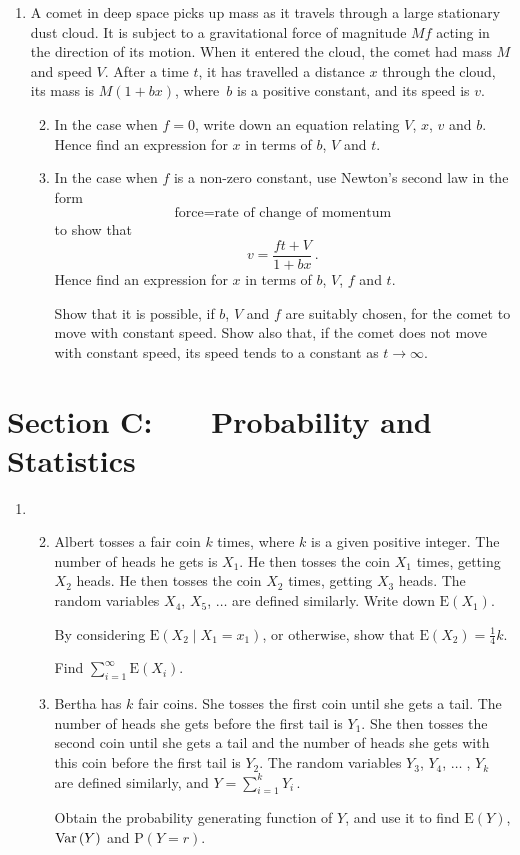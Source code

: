 \documentclass[a4, 11pt]{report}
\newlength{\qspace}
\newcounter{qnumber}
\newenvironment{question}%
 {\vspace{\qspace}
  \begin{enumerate}[\bfseries 1\quad][10]%
    \setcounter{enumi}{\value{qnumber}}%
    \item%
 }
{
  \end{enumerate}
  \filbreak
  \stepcounter{qnumber}
 }
\newenvironment{questionparts}[1][1]%
 {
  \begin{enumerate}[\bfseries (i)]%
    \setcounter{enumii}{#1}
    \addtocounter{enumii}{-1}
    \setlength{\itemsep}{5mm}
    \setlength{\parskip}{8pt}
 }
 {
  \end{enumerate}
 }
\def\E{{\mathrm E}}
\def\P{{\mathrm P}}
\def\var{{\rm Var}\,}
\begin{document}
\begin{question}
A comet in deep space picks up mass as it travels through a
large stationary dust cloud. 
It is subject to a gravitational force of magnitude
$M\!f$ acting in the direction of its motion.
When  it entered the 
cloud, the comet had mass  $M$ and  speed  $V$. 
After  a time $t$,
it has travelled a distance $x$ through the cloud, 
its mass is $M(1+bx)$, where~$b$ is a positive constant, and  its speed
is $v$. 

\begin{questionparts}
\item In the case when $f=0$, 
write down an  equation relating 
$V$, $x$, $v$ and $b$.
Hence find an expression for $x$ in  terms of $b$, $V$ and $t$.

\item  In the case when $f$ is a non-zero constant,
use Newton's second law in the form
\[
\text{force} = \text{rate of change of momentum}
\]
to show that
\[
v = \frac{ft+V}{1+bx}\,.
\]
Hence find an expression for $x$ in  terms of $b$, $V$, $f$ and $t$.

Show that it is possible, if $b$, $V$ and $f$ are suitably chosen,
for the comet to move with constant speed.  Show also 
that, 
if the comet does not
move with constant speed, its speed tends to  a constant as $t\to\infty$. 
\end{questionparts}
\end{question}
	

	
	\newpage
\section*{Section C: \ \ \ Probability and Statistics}


\begin{question}
\begin{questionparts}
\item
 Albert tosses a fair coin $k$ times, where $k$ is a given 
positive integer. The number of heads he gets is $X_1$. He
then tosses the coin $X_1$ times, getting $X_2$ heads.
He then tosses the coin $X_2$ times, getting $X_3$ heads. 
The random variables $X_4$, $X_5$, $\ldots$ are defined similarly.
Write down $\E(X_1)$. 

By considering $\E(X_2 \; \big\vert \; X_1 = x_1)$, 
or otherwise, show that $\E(X_2) = \frac14 k$. 

Find $\displaystyle \sum_{i=1}^\infty \E(X_i)$.


\item Bertha has $k$ fair coins. She tosses the first coin 
until she gets a tail. The number of heads she gets before
the first tail is $Y_1$. She then tosses the second coin
until she gets a tail and the number of heads she gets with this coin
before
the first tail is $Y_2$. The random variables $Y_3$, $Y_4$,
$\ldots\;$, $Y_k$ are defined similarly, and 
 $Y= \sum\limits_{i=1}^k Y_i\,$. 

Obtain  the probability generating function of $Y$, and
use it to find $\E(Y)$, $\var(Y)$ and $\P(Y=r)$.

\end{questionparts}
\end{question}
\end{document}
